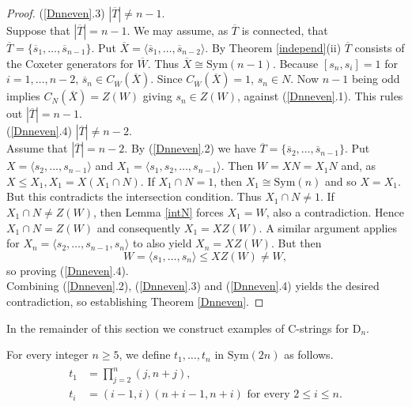 \documentclass{amsart}
\numberwithin{equation}{section}
\theoremstyle{plain} %
\begin{document}
\begin{proof}
(\ref{Dnneven}.3) $|\overline{T}| \not= n - 1$.\\

Suppose that $|\overline{T}| = n - 1$.  We may assume, as $\overline{T}$ is connected, that $\overline{T} = \{ \overline{s}_1,  \dots , \overline{s}_{n - 1} \}$. Put $\overline{X} = \langle \overline{s}_1,  \dots , \overline{s}_{n - 2} \rangle$. By Theorem \ref{independ}(ii) $\overline{T}$ consists of the Coxeter generators for $\overline{W}$. Thus $\overline{X} \cong \mathrm{Sym}(n-1)$. Because $[s_n,s_i] =1$ for $i =1, \dots, n-2$, $\overline{s}_n \in C_{\overline{W}}(\overline{X})$. Since $C_{\overline{W}}(\overline{X}) = 1$, $s_n \in N$. Now $n - 1$ being odd implies $C_N(\overline{X}) = Z(W)$ giving $s_n \in Z(W)$, against (\ref{Dnneven}.1). This rules out $|\overline{T}| = n - 1$.\\

(\ref{Dnneven}.4) $|\overline{T}| \not= n - 2$.\\

Assume that $|\overline{T}| = n - 2$. By (\ref{Dnneven}.2) we have  $\overline{T} = \{ \overline{s}_2,  \dots , \overline{s}_{n - 1} \}$. Put $X = \langle s_2, \dots , s_{n-1} \rangle$ and $X_1 = \langle s_1,s_2, \dots , s_{n-1} \rangle$. Then $W = XN = X_1 N$ and, as $X \leq X_1, X_1 = X(X_1 \cap N)$. If $X_1 \cap N = 1$, then $X_1 \cong \mathrm{Sym}(n)$ and so $X=X_1$. But this contradicts the intersection condition. Thus $X_1 \cap N \not= 1$.  If $X_1 \cap N \not= Z(W)$, then Lemma \ref{intN} forces $X_1 =W$, also a contradiction. Hence $X_1 \cap N = Z(W)$ and consequently $X_1 = XZ(W)$. A similar argument applies for $X_n = \langle s_2, \dots , s_{n-1}, s_n \rangle$ to also yield $X_n = XZ(W)$. But then 
$$W = \langle s_1, \dots,  s_n \rangle \leq XZ(W) \not= W,$$
so proving (\ref{Dnneven}.4).\\

Combining (\ref{Dnneven}.2), (\ref{Dnneven}.3) and (\ref{Dnneven}.4) yields the desired contradiction, so establishing Theorem \ref{Dnneven}.
\end{proof}



In the remainder of this section we construct examples of C-strings for $\mathrm{D}_n$.


For every integer $n \ge 5$, we define $t_1,\dots,t_n$ in $\mathrm{Sym}(2n)$ as follows.
\begin{align*}
\begin{split}
t_1&=\prod_{j=2}^{n}(j,n+j), \\
t_i&=(i-1,i)(n+i-1,n+i) \text{ for every } 2 \leq i \leq n.
\end{split}
\end{align*}
\end{document}
